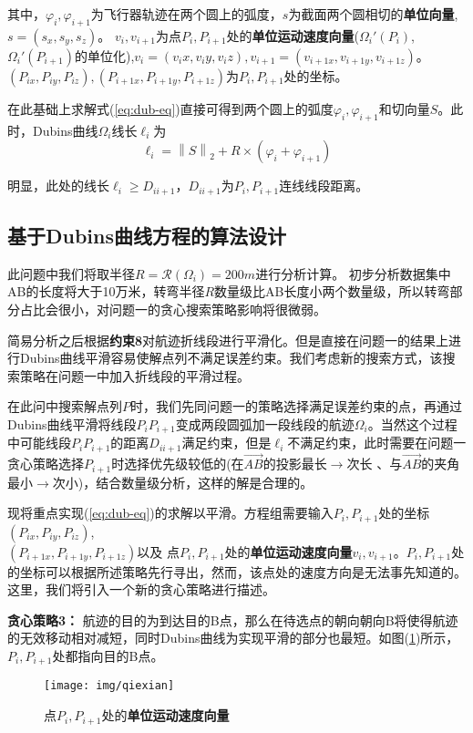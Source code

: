其中，$\varphi_{i},\varphi_{i+1}$为飞行器轨迹在两个圆上的弧度，$s$为截面两个圆相切的\textbf{单位向量},$s=(s_x,s_y,s_z)$。
$v_i,v_{i+1}$为点$P_i,P_{i+1}$处的\textbf{单位运动速度向量}($\Omega_{i}'(P_i)$,$\Omega_{i}'(P_{i+1})$的单位化),$v_i=(v_ix,v_iy,v_iz),v_{i+1}=(v_{i+1x},v_{i+1y},v_{i+1z})$。
$(P_{i x},P_{i y},P_{i z}),(P_{i+1 x},P_{i+1 y},P_{i+1 z})$为$P_i,P_{i+1}$处的坐标。

在此基础上求解式(\ref{eq:dub-eq})直接可得到两个圆上的弧度$\varphi_{i},\varphi_{i+1} $和切向量$S$。此时，Dubins曲线$\Omega_{i}$线长$\ell_i$为
\begin{equation}
\ell_i  = \left \| S \right \|_2 + R \times (\varphi_{i}+\varphi_{i+1}) 
\end{equation}

明显，此处的线长$\ell_i \geq D_{ii+1}$，$D_{ii+1}$为$P_i,P_{i+1}$连线线段距离。

\subsection{基于Dubins曲线方程的算法设计}
此问题中我们将取半径$R = \mathcal{R}(\Omega_{i}) = 200m$进行分析计算。
初步分析数据集中AB的长度将大于10万米，转弯半径$R$数量级比AB长度小两个数量级，所以转弯部分占比会很小，对问题一的贪心搜索策略影响将很微弱。

简易分析之后根据\textbf{约束8}对航迹折线段进行平滑化。但是直接在问题一的结果上进行Dubins曲线平滑容易使解点列不满足误差约束。我们考虑新的搜索方式，该搜索策略在问题一中加入折线段的平滑过程。

在此问中搜索解点列$P$时，我们先同问题一的策略选择满足误差约束的点，再通过Dubins曲线平滑将线段$P_iP_{i+1}$变成两段圆弧加一段线段的航迹$\Omega_i$。当然这个过程中可能线段$P_iP_{i+1}$的距离$D_{ii+1}$满足约束，但是$ \ell_i $不满足约束，此时需要在问题一贪心策略选择$P_{i+1}$时选择优先级较低的(在$\overrightarrow{AB} $的投影最长$\longrightarrow$次长 、与$\overrightarrow{AB} $的夹角最小$\longrightarrow$次小)，结合数量级分析，这样的解是合理的。

现将重点实现(\ref{eq:dub-eq})的求解以平滑。方程组需要输入$P_i,P_{i+1}$处的坐标$(P_{i x},P_{i y},P_{i z})$,\\$(P_{i+1 x},P_{i+1 y},P_{i+1 z})$以及
点$P_i,P_{i+1}$处的\textbf{单位运动速度向量}$v_i,v_{i+1}$。$P_i,P_{i+1}$处的坐标可以根据所述策略先行寻出，然而，该点处的速度方向是无法事先知道的。这里，我们将引入一个新的贪心策略进行描述。

\noindent \textbf{贪心策略3：} 航迹的目的为到达目的B点，那么在待选点的朝向朝向B将使得航迹的无效移动相对减短，同时Dubins曲线为实现平滑的部分也最短。如图(\ref{fig:qiexian})所示，$P_i,P_{i+1}$处都指向目的B点。
\begin{figure}[h]
    \centering
    \texttt{[image: img/qiexian]}
    \caption{点$P_i,P_{i+1}$处的\textbf{单位运动速度向量}}
    \label{fig:qiexian}
\end{figure}

